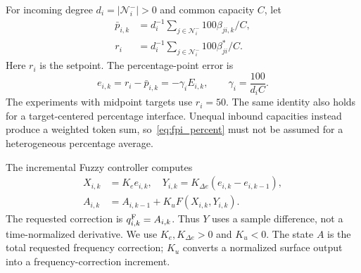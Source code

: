 For incoming degree $d_i=|\mathcal N_i^-|>0$ and common capacity $C$, let
\begin{equation*}
\begin{aligned}
 \bar p_{i,k}&=d_i^{-1}\sum_{j\in\mathcal N_i^-}100\beta_{ji,k}/C,\\
 r_i&=d_i^{-1}\sum_{j\in\mathcal N_i^-}100\beta^*_{ji}/C.
\end{aligned}
\end{equation*}
Here $r_i$ is the setpoint. The percentage-point error is
\begin{equation}
 e_{i,k}=r_i-\bar p_{i,k}=-\gamma_iE_{i,k},
 \qquad \gamma_i=\frac{100}{d_iC}.
 \label{eq:fpi_percent}
\end{equation}
The experiments with midpoint targets use $r_i=50$. The same identity also
holds for a target-centered percentage interface. Unequal inbound capacities
instead produce a weighted token sum, so~\eqref{eq:fpi_percent} must not be
assumed for a heterogeneous percentage average.

The incremental Fuzzy controller computes
\begin{align}
 X_{i,k}&=K_e e_{i,k},\quad
 Y_{i,k}=K_{\Delta e}(e_{i,k}-e_{i,k-1}),\nonumber\\
 A_{i,k}&=A_{i,k-1}+K_u F(X_{i,k},Y_{i,k}).
 \label{eq:fpi_fuzzy_law}
\end{align}
The requested correction is $q^{\rm F}_{i,k}=A_{i,k}$.
Thus $Y$ uses a sample difference, not a time-normalized derivative.
We use $K_e,K_{\Delta e}>0$ and $K_u<0$. The state $A$ is the total
requested frequency correction; $K_u$ converts a normalized surface
output into a frequency-correction increment.

